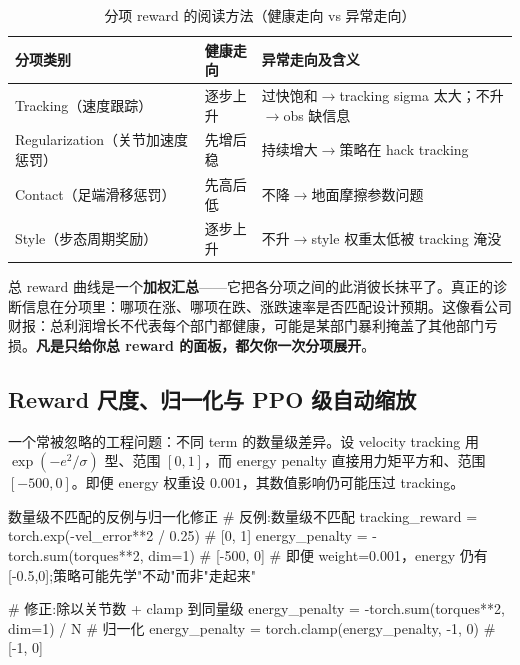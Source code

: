 \begin{table}[H]
\centering
\caption{分项 reward 的阅读方法（健康走向 vs 异常走向）}
\label{tab:rlmc-diag-rewterm}
\begin{tabular}{p{2.6cm}p{3.6cm}p{6.0cm}}
\hline
分项类别 & 健康走向 & 异常走向及含义 \\
\hline
Tracking（速度跟踪） & 逐步上升 & 过快饱和$\to$tracking sigma 太大；不升$\to$obs 缺信息 \\
Regularization（关节加速度惩罚） & 先增后稳 & 持续增大$\to$策略在 hack tracking \\
Contact（足端滑移惩罚） & 先高后低 & 不降$\to$地面摩擦参数问题 \\
Style（步态周期奖励） & 逐步上升 & 不升$\to$style 权重太低被 tracking 淹没 \\
\hline
\end{tabular}
\end{table}

\begin{insight}\label{ins:rlmc-diag-decompose}
总 reward 曲线是一个\textbf{加权汇总}——它把各分项之间的此消彼长抹平了。真正的诊断信息在分项里：哪项在涨、哪项在跌、涨跌速率是否匹配设计预期。这像看公司财报：总利润增长不代表每个部门都健康，可能是某部门暴利掩盖了其他部门亏损。\textbf{凡是只给你总 reward 的面板，都欠你一次分项展开}。
\end{insight}

\subsection{Reward 尺度、归一化与 PPO 级自动缩放}

一个常被忽略的工程问题：不同 term 的数量级差异。设 velocity tracking 用 $\exp(-e^2/\sigma)$ 型、范围 $[0,1]$，而 energy penalty 直接用力矩平方和、范围 $[-500,0]$。即便 energy 权重设 $0.001$，其数值影响仍可能压过 tracking。

\begin{codebox}[Python]{数量级不匹配的反例与归一化修正}
# 反例:数量级不匹配
tracking_reward = torch.exp(-vel_error**2 / 0.25)      # [0, 1]
energy_penalty  = -torch.sum(torques**2, dim=1)        # [-500, 0]
# 即便 weight=0.001，energy 仍有 [-0.5,0];策略可能先学"不动"而非"走起来"

# 修正:除以关节数 + clamp 到同量级
energy_penalty  = -torch.sum(torques**2, dim=1) / N     # 归一化
energy_penalty  = torch.clamp(energy_penalty, -1, 0)    # [-1, 0]
\end{codebox}

